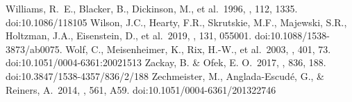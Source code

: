 \documentclass[modern, linenumbers]{aastex631}
\begin{document}
\begin{thebibliography}{dummy}
 Williams, R.~E., Blacker, B., Dickinson, M., et al.\ 1996, \aj, 112, 1335. doi:10.1086/118105
 Wilson, J.C., Hearty, F.R., Skrutskie, M.F., Majewski, S.R., Holtzman, J.A., Eisenstein, D., et al.\ 2019, \pasp, 131, 055001. doi:10.1088/1538-3873/ab0075.
 Wolf, C., Meisenheimer, K., Rix, H.-W., et al.\ 2003, \aap, 401, 73. doi:10.1051/0004-6361:20021513
 Zackay, B. \& Ofek, E. O.\ 2017, \apj, 836, 188. doi:10.3847/1538-4357/836/2/188
 Zechmeister, M., Anglada-Escud{\'e}, G., \& Reiners, A.\ 2014, \aap, 561, A59. doi:10.1051/0004-6361/201322746

\end{thebibliography}
\end{document}
